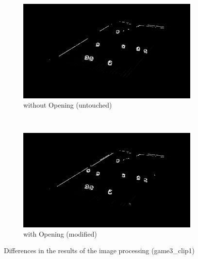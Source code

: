 \begin{figure}[h!]
    \centering
    \begin{subfigure}[b]{0.85\textwidth}
        \centering
        \includegraphics[width=\textwidth]{imgs/ball_localization/final_first.jpg}
        \caption{without Opening (untouched)}
    \end{subfigure}
    \\
    \begin{subfigure}[b]{0.85\textwidth}
        \centering
        \includegraphics[width=\textwidth]{imgs/ball_localization/final_second.jpg}
        \caption{with Opening (modified)}
    \end{subfigure}
    \caption{Differences in the results of the image processing (game3\_clip1)}
    \label{fig:opening}
\end{figure}

